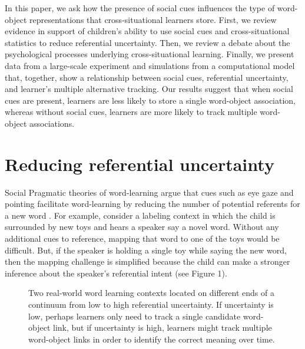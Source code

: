 \documentclass[man]{apa2}
\begin{document}
In this paper, we ask how the presence of social cues influences the type of word-object representations that cross-situational learners store. First, we review evidence in support of children's ability to use social cues and cross-situational statistics to reduce referential uncertainty. Then, we review a debate about the psychological processes underlying cross-situational learning. Finally, we present data from a large-scale experiment and simulations from a computational model that, together, show a relationship between social cues, referential uncertainty, and learner's multiple alternative tracking. Our results suggest that when social cues are present, learners are less likely to store a single word-object association, whereas without social cues, learners are more likely to track multiple word-object associations.


\section{Reducing referential uncertainty}

Social Pragmatic theories of word-learning argue that cues such as eye gaze and pointing facilitate word-learning by reducing the number of potential referents for a new word \cite{bloom2002children, tomasello2009constructing}. For example, consider a labeling context in which the child is surrounded by new toys and hears a speaker say a novel word. Without any additional cues to reference, mapping that word to one of the toys would be difficult. But, if the speaker is holding a single toy while saying the new word, then the mapping challenge is simplified because the child can make a stronger inference about the speaker's referential intent (see Figure 1). 

%
\begin{figure}[H]
	\centering
	\caption{Two real-world word learning contexts located on different ends of a continuum from low to 	high referential uncertainty. If uncertainty is low, perhaps learners only need to track a single 		candidate word-object link, but if uncertainty is high, learners might track multiple word-object links in 	order to identify the correct meaning over time.}
\end{figure}
%
\newpage
\end{document}
